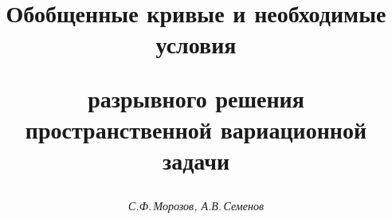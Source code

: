 

 




\newcommand{\const}{\operatorname{const}} 


\newcommand{\mes}{\operatorname{mes}} 


\newcommand{\supp}{\operatorname{supp}} 


\newcommand{\tts}[1]{} 


\renewcommand{\baselinestretch}{0.97}


 




 


\setcounter{page}{21} 












 


\author{\it С.Ф.\,Морозов, А.В.\,Семенов} 




\title{Обобщенные кривые и необходимые условия  


разрывного решения пространственной вариационной задачи} 


 


\date{} 




\pagestyle{plain} %


 




